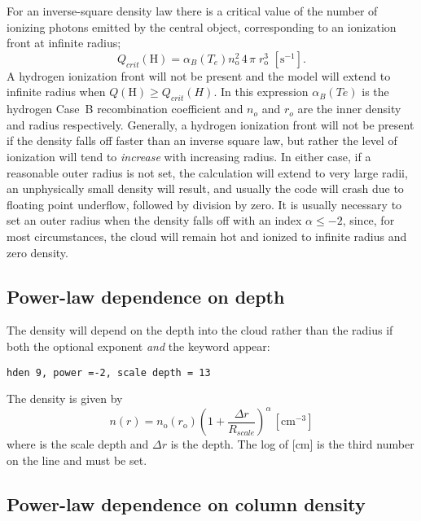 For an inverse-square density law there is a critical value of the number
of ionizing photons emitted by the central object, corresponding to an
ionization front at infinite radius;
\begin{equation}
Q_{crit} \left( {\mathrm{H}} \right) = \alpha _B \left( {T_e }
\right)n_{\mathrm{o}}^2 \,4\,\pi \;r_{\mathrm{o}}^{\mathrm{3}}
\,\, [\mathrm{s}^{-1}] .
\end{equation}
A hydrogen ionization front will not be present and the model will extend
to infinite radius when $Q(\mathrm{H}) \ge Q_{crit}(H)$.
In this expression
$\alpha_B(Te)$ is the
hydrogen Case~B recombination coefficient
and $n_o$ and $r_o$ are the inner density
and radius respectively.
Generally, a hydrogen ionization front will not
be present if the density falls off faster than an inverse square law,
but
rather the level of ionization will tend to \emph{increase}
with increasing radius.
In either case, if a reasonable outer radius is not set, the calculation
will extend to very large radii,
an unphysically small density will result,
and usually the code will crash due to floating point underflow,
followed by division by zero.
It is usually necessary to set an outer radius when
the density falls off with an index $\alpha \le -2$,
since, for most circumstances,
the cloud will remain hot and ionized to infinite radius and zero density.

\subsection{Power-law dependence on depth}

The density will depend on the depth into the cloud rather than the radius
if both the optional exponent \emph{and} the keyword  appear:
\begin{verbatim}
hden 9, power =-2, scale depth = 13
\end{verbatim}
The density is given by
\begin{equation}
n\left( r \right) = n_{\mathrm{o}} \left( {r_{\mathrm{o}} } \right)\left( {1 +
\frac{{\Delta r}}{{R_{scale} }}} \right)^\alpha  \, [\mathrm{cm}^{-3}]%
\end{equation}
where  is the scale depth and $\Delta r$ is the depth.
The log of  [cm] is the
third number on the line and must be set.

\subsection{Power-law dependence on column density }

